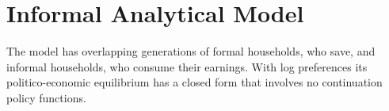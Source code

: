\edef\refsec{\refmodelsec}
\edef\refeq{\refmodeleq}

\section{Informal Analytical Model}\label{\refsec}
The model has overlapping generations of formal households, who save, and informal households, who consume their earnings. With log preferences its politico-economic equilibrium has a closed form that involves no continuation policy functions.







